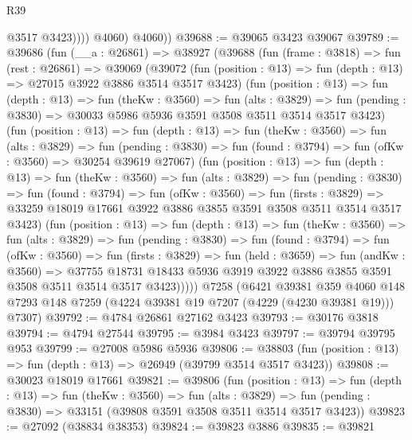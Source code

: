 \begin{lexlean}{R39}
\begin{coremodule}
                  @3517
                  @3423))))
          @4060)
        @4060))
@39688 := @39065 @3423 @39067
@39789 := @39686
    (fun (__a : @26861) =>
    @38927
      (@39688
        (fun (frame : @3818) =>
        fun (rest : @26861) =>
        @39069
          (@39072
            (fun (position : @13) => fun (depth : @13) => @27015 @3922 @3886 @3514 @3517 @3423)
            (fun (position : @13) =>
            fun (depth : @13) =>
            fun (theKw : @3560) =>
            fun (alts : @3829) =>
            fun (pending : @3830) => @30033 @5986 @5936 @3591 @3508 @3511 @3514 @3517 @3423)
            (fun (position : @13) =>
            fun (depth : @13) =>
            fun (theKw : @3560) =>
            fun (alts : @3829) =>
            fun (pending : @3830) =>
            fun (found : @3794) => fun (ofKw : @3560) => @30254 @39619 @27067)
            (fun (position : @13) =>
            fun (depth : @13) =>
            fun (theKw : @3560) =>
            fun (alts : @3829) =>
            fun (pending : @3830) =>
            fun (found : @3794) =>
            fun (ofKw : @3560) =>
            fun (firsts : @3829) =>
            @33259 @18019 @17661 @3922 @3886 @3855 @3591 @3508 @3511 @3514 @3517 @3423)
            (fun (position : @13) =>
            fun (depth : @13) =>
            fun (theKw : @3560) =>
            fun (alts : @3829) =>
            fun (pending : @3830) =>
            fun (found : @3794) =>
            fun (ofKw : @3560) =>
            fun (firsts : @3829) =>
            fun (held : @3659) =>
            fun (andKw : @3560) =>
            @37755
              @18731
              @18433
              @5936
              @3919
              @3922
              @3886
              @3855
              @3591
              @3508
              @3511
              @3514
              @3517
              @3423)))))
    @7258
    (@6421
      @39381
      @359
      @4060
      @148
      @7293
      @148
      @7259
      (@4224 @39381 @19 @7207 (@4229 (@4230 @39381 @19)))
      @7307)
@39792 := @4784 @26861 @27162 @3423
@39793 := @30176 @3818
@39794 := @4794 @27544
@39795 := @3984 @3423
@39797 := @39794 @39795 @953
@39799 := @27008 @5986 @5936
@39806 := @38803 (fun (position : @13) => fun (depth : @13) => @26949 (@39799 @3514 @3517 @3423))
@39808 := @30023 @18019 @17661
@39821 := @39806
    (fun (position : @13) =>
    fun (depth : @13) =>
    fun (theKw : @3560) =>
    fun (alts : @3829) =>
    fun (pending : @3830) => @33151 (@39808 @3591 @3508 @3511 @3514 @3517 @3423))
@39823 := @27092 (@38834 @38353)
@39824 := @39823 @3886
@39835 := @39821

\end{coremodule}
\end{lexlean}
